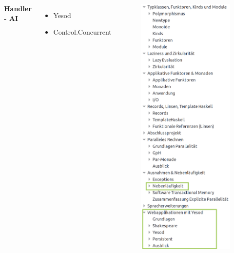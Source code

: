 \documentclass{beamer}
\begin{document}
\begin{frame}

\begin{columns}

{\Large \textbf{Handler - AI}}

\begin{itemize}
    \item Yesod
    \item Control.Concurrent
\end{itemize}


\begin{figure}
\includegraphics[height=0.9\paperheight]{cont/ssaihandler.png}
\end{figure}

\end{columns}

\end{frame}
\end{document}
